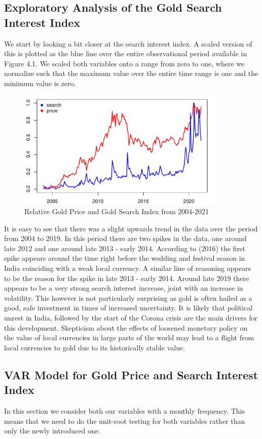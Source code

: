 \documentclass[a4paper]{article}
\theoremstyle{definition}
\begin{document}
\subsection{Exploratory Analysis of the Gold Search Interest Index}
We start by looking a bit closer at the search interest index. A scaled version of this is plotted as the blue line over the entire observational period available in Figure 4.1. We scaled both variables onto a range from zero to one, where we normalize such that the maximum value over the entire time range is one and the minimum value is zero.
	\begin{figure}[!t]
	\centering
	\caption{Relative Gold Price and Gold Search Index from 2004-2021}
	\includegraphics[width=0.90\textwidth]{comparisonPriceSearch}
	\end{figure}
It is easy to see that there was a slight upwards trend in the data over the period from 2004 to 2019. In this period there are two spikes in the data, one around late 2012 and one around late 2013 - early 2014. According to \citeauthor{Desk.24062016} (2016) the first spike appears around the time right before the wedding and festival season in India coinciding with a weak local currency. A similar line of reasoning appears to be the reason for the spike in late 2013 - early 2014. Around late 2019 there appears to be a very strong search interest increase, joint with an increase in volatility. This however is not particularly surprising as gold is often hailed as a good, safe investment in times of increased uncertainty. It is likely that political unrest in India, followed by the start of the Corona crisis are the main drivers for this development. Skepticism about the effects of loosened monetary policy on the value of local currencies in large parts of the world may lead to a flight from local currencies to gold due to its historically stable value. 
%
\subsection{VAR Model for Gold Price and Search Interest Index}
In this section we consider both our variables with a monthly frequency. This means that we need to do the unit-root testing for both variables rather than only the newly introduced one. 
\end{document}
